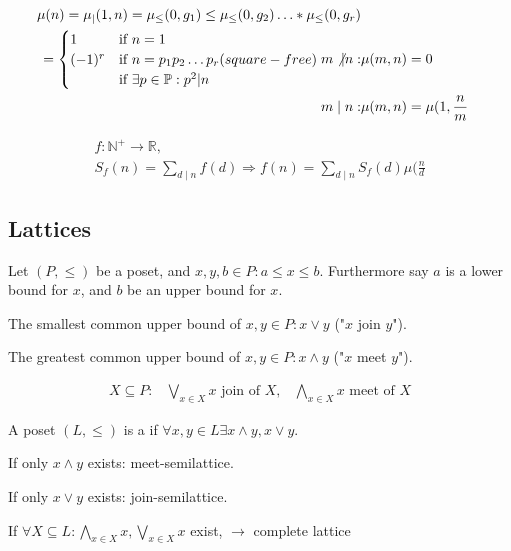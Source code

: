 \begin{align*}
    \mu(n) = \mu_{|}(1,n) = \mu_{\leq}(0,g_1) \leq \mu_{\leq}(0,g_2) \ldots * \mu_{\leq}(0,g_r) \\
    = \begin{cases} 
        1 & \text{if } n=1 \\
        (-1)^r & \text{if } n = p_1 p_2 \ldots p_r \text( square-free) \\
         & \text{if } \exists p\in \mathbb{P}: p^2|n
       \end{cases}
    m \not{\mid} n:    &\mu(m,n) = 0 \\
    m \mid n:    &\mu(m,n) = \mu(1, \frac{n}{m} \\
\end{align*}


\begin{align*}
    f: \mathbb{N}^{+} \rightarrow \mathbb{R}, \\
    S_f(n) = \sum_{d\mid n} f(d) \Rightarrow f(n) = \sum_{d\mid n} S_f(d)\mu(\frac{n}{d}
\end{align*}

\subsection{Lattices}
\begin{definition}
Let $(P, \leq)$ be a poset, and $x,y,b \in P: a\leq x \leq b$. Furthermore say $a$ is a lower bound for $x$, and $b$ be an upper bound for $x$.

The smallest common upper bound of $x,y \in P: x \vee y$ ("$x$ join $y$").

The greatest common upper bound of $x,y \in P: x \wedge y$ ("$x$ meet $y$").

\begin{align*}
    X \subseteq P: &\bigvee_{x \in X} x \text{ join of } X, 
        & \bigwedge_{x \in X} x \text{ meet of } X 
\end{align*}
\end{definition}

\begin{definition}
A poset $(L, \leq)$ is a  if $\forall x,y \in L \exists x \wedge y, x \vee y$.

If only $x \wedge y$ exists: meet-semilattice. 

If only $x \vee y$ exists: join-semilattice. 


If $\forall X \subseteq L : \bigwedge_{x \in X} x, \bigvee_{x \in X} x$ exist, $\rightarrow$ complete lattice
\end{definition}

